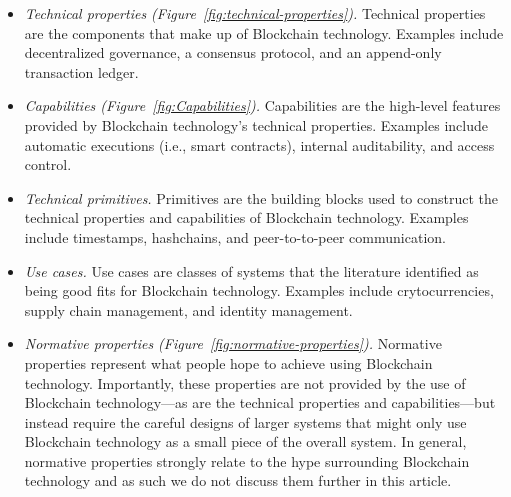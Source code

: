 \begin{itemize}
	\item \emph{Technical properties (Figure~\ref{fig:technical-properties}).}
	Technical properties are the components that make up of Blockchain technology. Examples include decentralized governance, a consensus protocol, and an append-only transaction ledger.
	
	\item \emph{Capabilities (Figure~\ref{fig:Capabilities}).}
	Capabilities are the high-level features provided by Blockchain technology's technical properties. Examples include automatic executions (i.e., smart contracts), internal auditability, and access control.
	
	\item \emph{Technical primitives.}
	Primitives are the building blocks used to construct the technical properties and capabilities of Blockchain technology. Examples include timestamps, hashchains, and peer-to-to-peer communication.
	
	\item \emph{Use cases.}
	Use cases are classes of systems that the literature identified as being good fits for Blockchain technology. Examples include crytocurrencies, supply chain management, and identity management.
	
	\item \emph{Normative properties (Figure~\ref{fig:normative-properties}).}
	Normative properties represent what people hope to achieve using Blockchain technology. 
	Importantly, these properties are not provided by the use of Blockchain technology---as are the technical properties and capabilities---but instead require the careful designs of larger systems that might only use Blockchain technology as a small piece of the overall system.
	In general, normative properties strongly relate to the hype surrounding Blockchain technology%
	and as such we do not discuss them further in this article.
\end{itemize}

